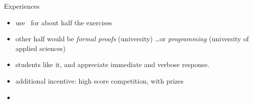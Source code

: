 \begin{slide}{Experiences}

\begin{itemize}
\item
  use \autotool\ for about half the exercises 
\item 
  other half would be \emph{formal proofs} (university) 
  \dots or \emph{programming} (university of applied sciences)
\item
  students like it, and appreciate immediate and verbose response.
\item
  additional incentive: high score competition, with prizes
\item
\end{itemize}

\end{slide}
